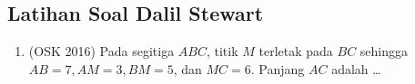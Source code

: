 \subsection{Latihan Soal Dalil Stewart}
\begin{enumerate}
    \item (OSK 2016) Pada segitiga $ABC$, titik $M$ terletak pada $BC$ sehingga $AB=7, AM=3, BM=5$, dan $MC=6$. Panjang $AC$ adalah \dots
\end{enumerate}